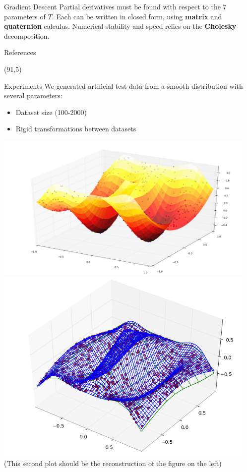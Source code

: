 \documentclass[final]{beamer}
\begin{document}
\begin{frame}{}
\begin{textblock}{27}
\begin{block}{Gradient Descent}
Partial derivatives must be found with respect to the 7 parameters of $T$. Each can be written in closed form,
using {\bf matrix} and {\bf quaternion} calculus. Numerical stability and speed relies on the {\bf Cholesky} decomposition.
\end{block}


\begin{block}{References}
{
 
 
}
\end{block}


\end{textblock}
\begin{textblock}{27}(91,5)

\begin{block}{Experiments}
We generated artificial test data from a smooth distribution with several parameters:
\begin{itemize}
\item Dataset size (100-2000)
\item Rigid transformations between datasets
\end{itemize}
\includegraphics[width=5in]{DistributionPlusPoints.png}
\includegraphics[width=5in]{Reconstruction.png}
(This second plot should be the reconstruction of the figure on the left)
\end{block}






\end{textblock}
\end{frame}
\end{document}
